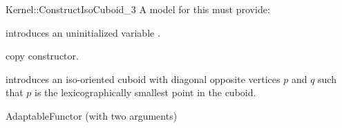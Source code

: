 \begin{ccRefFunctionObjectConcept}{Kernel::ConstructIsoCuboid_3}
A model for this must provide:



\ccHidden {}
             {introduces an uninitialized variable .}

\ccHidden {}
            {copy constructor.}

            {introduces an iso-oriented cuboid  with diagonal
             opposite vertices $p$ and $q$ such that $p$ is the
             lexicographically smallest point in the cuboid.}

\ccRefines
AdaptableFunctor (with two arguments)

\ccSeeAlso
{}  \\

\end{ccRefFunctionObjectConcept}
